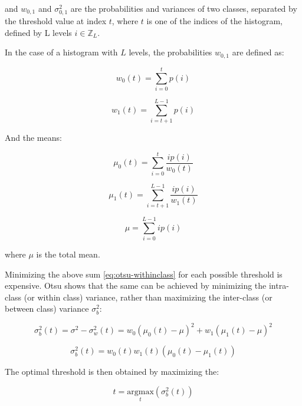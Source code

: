 and $w_{0,1}$ and $\sigma_{0,1}^2$ are the probabilities and variances of two classes, separated by the threshold value at index $t$, where $t$ is one of the indices of the histogram, defined by L levels $i \in \mathbb{Z}_L$. 

In the case of a histogram with $L$ levels, the probabilities $w_{0,1}$ are defined as:

\begin{equation}
w_0(t) = \sum_{i=0}^{t}{p(i)}
\end{equation}

\begin{equation}
w_1(t) = \sum_{i=t+1}^{L-1}{p(i)}
\end{equation}

And the means:

\begin{equation}
\mu_0(t) = \sum_{i=0}^{t}{\frac{i p(i)}{w_0(t)}}
\end{equation}

\begin{equation}
\mu_1(t) = \sum_{i=t+1}^{L-1}{\frac{i p(i)}{w_1(t)}}
\end{equation}

\begin{equation}
\mu = \sum_{i=0}^{L-1}{i p(i)}
\end{equation}

where $\mu$ is the total mean. 

Minimizing the above sum \ref{eq:otsu-withinclass} for each possible threshold is expensive. Otsu shows that the same can be achieved by minimizing the intra-class (or within class) variance, rather than maximizing the inter-class (or between class) variance $\sigma_b^2$:

\begin{equation}
\sigma_b^2(t) = \sigma^2 - \sigma_w^2(t) = w_0 \left(\mu_0(t) - \mu \right)^2 + w_1 \left(\mu_1(t) - \mu \right)^2 
\end{equation}

\begin{equation}
\sigma_b^2(t) = w_0(t) w_1(t) \left( \mu_0(t) - \mu_1(t) \right)
\label{eq:otsu_between_variance}
\end{equation}

The optimal threshold is then obtained by maximizing the:

\begin{equation}
t = \underset{t}{\mathrm{argmax}}\left(\sigma_b^2(t)\right)
\end{equation}

